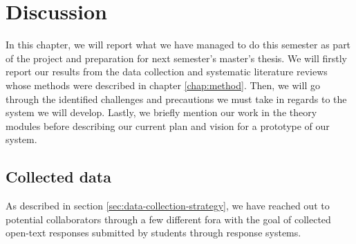 \chapter{Discussion}\label{chap:discussion}

In this chapter, we will report what we have managed to do this semester as part of the project and preparation for next semester's master's thesis. We will firstly report our results from the data collection and systematic literature reviews whose methods were described in chapter \ref{chap:method}. Then, we will go through the identified challenges and precautions we must take in regards to the system we will develop. Lastly, we briefly mention our work in the theory modules before describing our current plan and vision for a prototype of our system.

\section{Collected data}

As described in section \ref{sec:data-collection-strategy}, we have reached out to potential collaborators through a few different fora with the goal of collected open-text responses submitted by students through response systems.

